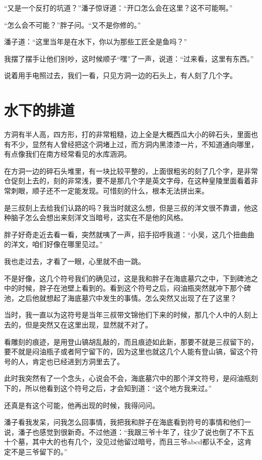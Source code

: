 “又是一个反打的坑道？”潘子惊讶道：“开口怎么会在这里？这不可能啊。”

“怎么会不可能？”胖子问。“又不是你修的。”

潘子道：“这里当年是在水下，你以为那些工匠全是鱼吗？”

我摆了摆手让他们别吵，这时候顺子“嘿”了一声，说道：“过来看，这里有东西。”

说着用手电照过去，我们一看，只见方洞一边的石头上，有人刻了几个字。

\chapter{水下的排道}

方洞有半人高，四方形，打的非常粗糙，边上全是大概西瓜大小的碎石头，里面也有不少，显然有人曾经把这个洞堵上过，而方洞内黑漆漆一片，不知道通向哪里，有点像我们在南方经常看见的水库涵洞。

在方洞一边的碎石头堆里，有一块比较平整的，上面很粗劣的刻了几个字，是非常仓促刻上去的，刻的非常浅，要不是那几个字是英文字母，在这种皇陵里面看着非常刺眼，顺子还不一定能发现。可惜刻的什么，根本无法拼出来。

是三叔刻上去给我们认路的吗？我当时就这么想，但是三叔的洋文很不靠谱，他这种脑子怎么会想出来刻洋文当暗号，这实在不是他的风格。

胖子好奇走近去看一看，突然就咦了一声，招手招呼我道：“小吴，这几个扭曲曲的洋文，咱们好像在哪里见过。”

我也走过去，才看了一眼，心里就不由一跳。

不是好像，这几个符号我们的确见过，这是我和胖子在海底墓穴之中，下到碑池之中的时候，胖子在池壁上看到的。看到这个符号之后，闷油瓶突然就冲下那个碑池，之后他就想起了海底墓穴中发生的事情。怎么突然又出现了在了这里？

当时，我一直以为这符号是当年三叔带文锦他们下来的时候，那几个人中的人刻上去的，但是突然又在这里出现，显然就不对了。

看雕刻的痕迹，是用登山镐胡乱敲的，而且痕迹如此新，那要不就是三叔留下的，要不就是闷油瓶子或者阿宁留下的，因为这里也就这几个人能有登山镐，留这个符号的人，肯定也已经进到方洞里去了。

此时我突然有了一个念头，心说会不会，海底墓穴中的那个洋文符号，是闷油瓶刻下的，所以他看到这个符号之后，才会知到道：“这个地方我来过。”

还真是有这个可能，他再出现的时候，我得问问。

潘子看我发呆，问我怎么回事情，我把我和胖子在海底看到符号的事情和他们一说，潘子也感觉到很新奇。不过他道：“我跟三爷十年了，往少了说也倒了不下五十个墓，其中大的也有几个，没见过他留过暗号，而且三爷abcd都认不全，这肯定不是三爷留下的。”

